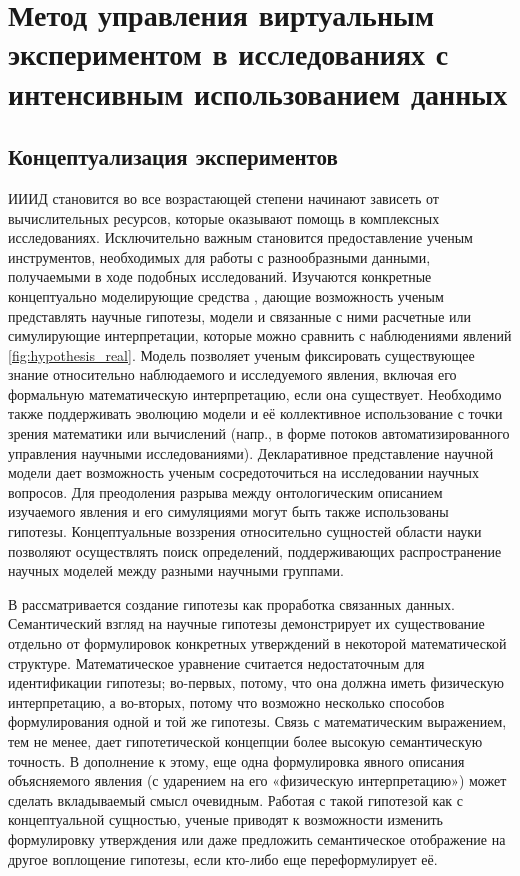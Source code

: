 \chapter{Метод управления виртуальным экспериментом в исследованиях с интенсивным использованием данных} \label{chapt2}
\newtheorem{mydef}{Definition}

\section{Концептуализация экспериментов}\label{sect1_2_6}

ИИИД становится во все возрастающей степени начинают зависеть от вычислительных ресурсов, которые оказывают помощь в 
комплексных исследованиях. Исключительно важным становится предоставление ученым инструментов, необходимых для работы 
с разнообразными данными, получаемыми в ходе подобных исследований. Изучаются конкретные концептуально моделирующие 
средства \cite{porto2013}, дающие возможность ученым представлять научные гипотезы, модели и связанные с ними расчетные 
или симулирующие интерпретации, которые можно сравнить с наблюдениями явлений \cref{fig:hypothesis_real}. Модель 
позволяет ученым фиксировать существующее знание относительно наблюдаемого и исследуемого явления, включая его 
формальную математическую интерпретацию, если она существует. Необходимо также поддерживать эволюцию модели и её 
коллективное использование с точки зрения математики или вычислений (напр., в форме потоков автоматизированного 
управления научными исследованиями). Декларативное представление научной модели дает возможность ученым сосредоточиться 
на исследовании научных вопросов. Для преодоления разрыва между онтологическим описанием изучаемого явления и его 
симуляциями могут быть также использованы гипотезы. Концептуальные воззрения относительно сущностей области науки 
позволяют осуществлять поиск определений, поддерживающих распространение научных моделей между разными 
научными группами. 

В \cite{Goncalves2013} рассматривается создание гипотезы как проработка связанных данных. Семантический взгляд на 
научные гипотезы демонстрирует их существование отдельно от формулировок конкретных утверждений в некоторой 
математической структуре. Математическое уравнение считается недостаточным для идентификации гипотезы; во-первых, 
потому, что она должна иметь физическую интерпретацию, а во-вторых, потому что возможно несколько способов 
формулирования одной и той же гипотезы. Связь с математическим выражением, тем не менее, дает гипотетической 
концепции более высокую семантическую точность. В дополнение к этому, еще одна формулировка явного описания 
объясняемого явления (с ударением на его «физическую интерпретацию») может сделать вкладываемый смысл очевидным. 
Работая с такой гипотезой как с концептуальной сущностью, ученые приводят к возможности изменить формулировку 
утверждения или даже предложить семантическое отображение на другое воплощение гипотезы, если кто-либо еще 
переформулирует её.

